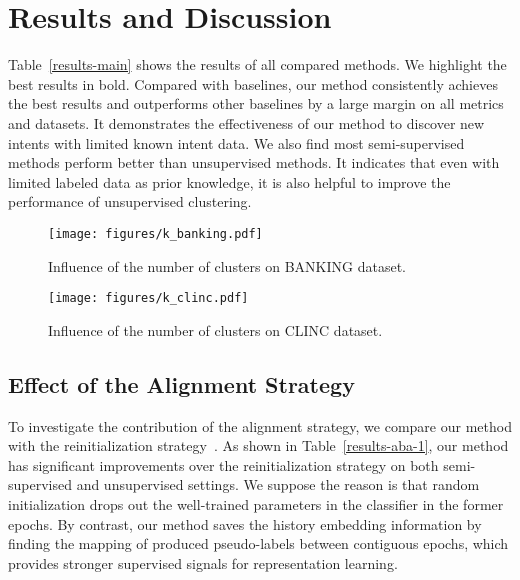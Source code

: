 \documentclass[letterpaper]{article} \usepackage{aaai21}  \usepackage{times}  \usepackage{helvet} \usepackage{courier}  \usepackage[hyphens]{url}  \usepackage{graphicx} \urlstyle{rm} \def\UrlFont{\rm}  \usepackage{natbib}  \usepackage{caption} \frenchspacing  \setlength{\pdfpagewidth}{8.5in}  \setlength{\pdfpageheight}{11in}  \usepackage{amsmath}
\begin{document}
	
	
	\section{Results and Discussion}
	Table~\ref{results-main} shows the results of all compared methods. We highlight the best results in bold. Compared with baselines, our method consistently achieves the best results and outperforms other baselines by a large margin on all metrics and datasets. It demonstrates the effectiveness of our method to discover new intents with limited known intent data. We also find most semi-supervised methods perform better than unsupervised methods. It indicates that even with limited labeled data as prior knowledge, it is also helpful to improve the performance of unsupervised clustering.
	
	\begin{figure*}[t!]
		\centering 
		\texttt{[image: figures/k\_banking.pdf]}
		\caption{\label{results-aba-3-1} Influence of the number of clusters on BANKING dataset.}
	\end{figure*}
	\begin{figure*}[t!]
		\centering  
		\texttt{[image: figures/k\_clinc.pdf]}
		\caption{\label{results-aba-3-2} Influence of the number of clusters on CLINC dataset.}
	\end{figure*}
	
	\subsection{Effect of the Alignment Strategy}
	To investigate the contribution of the alignment strategy, we compare our method with the reinitialization strategy~\cite{caron2018deep}. As shown in Table~\ref{results-aba-1}, our method has significant improvements over the reinitialization strategy on both semi-supervised and unsupervised settings. We suppose the reason is that random initialization drops out the well-trained parameters in the classifier in the former epochs. By contrast, our method saves the history embedding information by finding the mapping of produced pseudo-labels between contiguous epochs, which provides stronger supervised signals for representation learning. 
	
\end{document}
